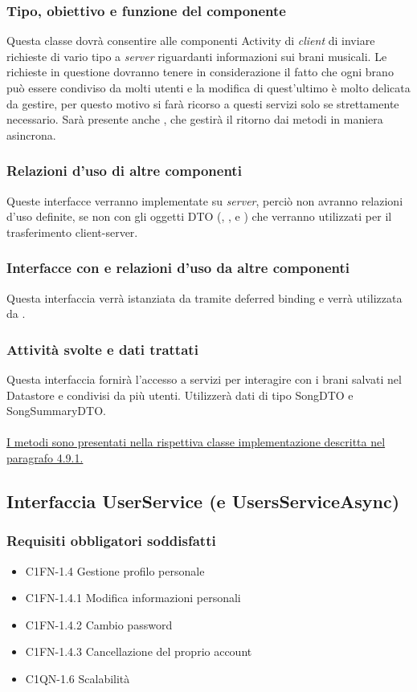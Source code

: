 \subsubsection*{Tipo, obiettivo e funzione del componente}
Questa classe dovr\`a consentire alle componenti Activity di \emph{client} di
inviare richieste di vario tipo a \emph{server} riguardanti informazioni sui
brani musicali. Le richieste in questione dovranno tenere in considerazione il
fatto che ogni brano pu\`o essere condiviso da molti utenti e la modifica di
quest'ultimo \`e molto delicata da gestire, per questo motivo si far\`a ricorso a
questi servizi solo se strettamente necessario. Sar\`a presente anche
, che gestir\`a il ritorno dai metodi in maniera asincrona. \subsubsection*{Relazioni d'uso di altre componenti}
Queste interfacce verranno implementate su \emph{server}, perci\`o non
avranno relazioni d'uso definite, se non con gli oggetti DTO
(, ,  e
) che verranno utilizzati per il trasferimento
client-server. \subsubsection*{Interfacce con e relazioni d'uso da altre componenti}
Questa interfaccia verr\`a istanziata da  tramite deferred
binding e verr\`a utilizzata da .
\subsubsection*{Attivit\`a svolte e dati trattati}
Questa interfaccia fornir\`a l'accesso a servizi per interagire con i brani
salvati nel Datastore e condivisi da pi\`u utenti. Utilizzer\`a dati di tipo
SongDTO e SongSummaryDTO.\\\\ \underline{I metodi sono presentati nella
rispettiva classe implementazione descritta nel paragrafo 4.9.1.}

\subsection{Interfaccia UserService (e UsersServiceAsync)}
\subsubsection*{Requisiti obbligatori soddisfatti}
\begin{itemize}
	\item C1FN-1.4 Gestione profilo personale
	\item C1FN-1.4.1 Modifica informazioni personali
	\item C1FN-1.4.2 Cambio password
	\item C1FN-1.4.3 Cancellazione del proprio account
    \item C1QN-1.6 Scalabilit\`a
\end{itemize}
